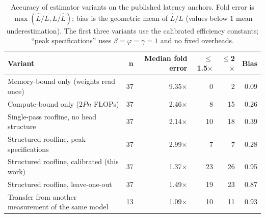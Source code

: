 \begin{table}[H]
\caption{Accuracy of estimator variants on the published latency anchors. Fold error is $\max(\hat L/L, L/\hat L)$; bias is the geometric mean of $\hat L/L$ (values below 1 mean underestimation). The first three variants use the calibrated efficiency constants; ``peak specifications'' uses $\beta=\varphi=\gamma=1$ and no fixed overheads.\label{tab:variants}}
\small
\begin{tabularx}{\textwidth}{@{}X r r r r r@{}}
\toprule
\textbf{Variant} & \textbf{n} & \textbf{Median fold error} & \textbf{$\le$1.5$\times$} & \textbf{$\le$2$\times$} & \textbf{Bias}\\
\midrule
Memory-bound only (weights read once) & 37 & 9.35$\times$ & 0 & 2 & 0.09\\
Compute-bound only ($2Pn$ FLOPs) & 37 & 2.46$\times$ & 8 & 15 & 0.26\\
Single-pass roofline, no head structure & 37 & 2.14$\times$ & 10 & 18 & 0.39\\
Structured roofline, peak specifications & 37 & 2.99$\times$ & 7 & 7 & 0.28\\
Structured roofline, calibrated (this work) & 37 & 1.37$\times$ & 23 & 26 & 0.95\\
Structured roofline, leave-one-out & 37 & 1.49$\times$ & 19 & 23 & 0.87\\
Transfer from another measurement of the same model & 13 & 1.09$\times$ & 10 & 11 & 0.93\\
\bottomrule
\end{tabularx}
\end{table}
